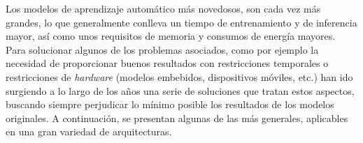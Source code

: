 \documentclass[a4paper]{article}
\begin{document}

Los modelos de aprendizaje automático más novedosos, son cada vez más grandes, lo que generalmente conlleva un tiempo de entrenamiento y de inferencia mayor, así como unos requisitos de memoria y consumos de energía mayores. Para solucionar algunos de los problemas asociados, como por ejemplo la necesidad de proporcionar buenos resultados con restricciones temporales o restricciones de \textit{hardware} (modelos embebidos, dispositivos móviles, etc.) han ido surgiendo a lo largo de los años una serie de soluciones que tratan estos aspectos, buscando siempre perjudicar lo mínimo posible los resultados de los modelos originales. A continuación, se presentan algunas de las más generales, aplicables en una gran variedad de arquitecturas.
\end{document}

